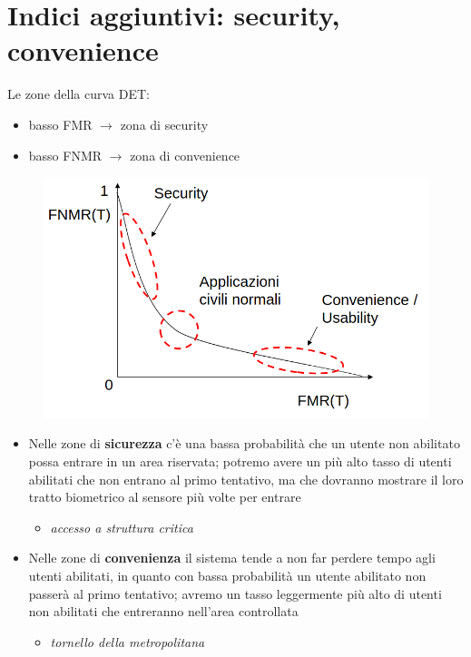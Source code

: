 \documentclass{report}
\begin{document}
\section{Indici aggiuntivi: security, convenience}

Le zone della curva DET:
\begin{itemize}
    \item basso FMR $\rightarrow$ zona di security
    \item basso FNMR $\rightarrow$ zona di convenience
\end{itemize}

\begin{figure}[H]
    \centering
    \includegraphics[width=0.8\linewidth]{images/sec-conv.png}
\end{figure}

\begin{itemize}
    \item Nelle zone di \textbf{sicurezza} c'è una bassa probabilità che un 
    utente non abilitato possa entrare in un area riservata; potremo avere 
    un più alto tasso di utenti abilitati che non entrano al primo tentativo, ma che 
    dovranno mostrare il loro tratto biometrico al sensore più volte per entrare 
    \begin{itemize}
        \item \textit{accesso a struttura critica}
    \end{itemize}
    \item Nelle zone di \textbf{convenienza} il sistema tende a non far perdere tempo 
    agli utenti abilitati, in quanto con bassa probabilità un utente abilitato non passerà 
    al primo tentativo; avremo un tasso leggermente più alto di utenti non abilitati che entreranno 
    nell'area controllata 
    \begin{itemize}
        \item \textit{tornello della metropolitana}
    \end{itemize}
\end{itemize}
\end{document}

